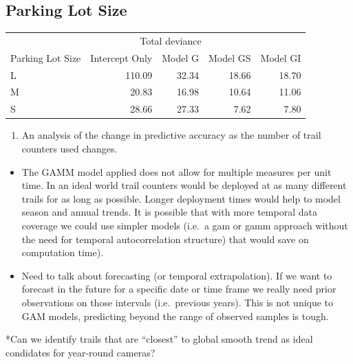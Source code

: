 \documentclass[
]{book}
\providecommand{\tightlist}{%
  \setlength{\itemsep}{0pt}\setlength{\parskip}{0pt}}
\begin{document}
\hypertarget{parking-lot-size}{%
\subsection{Parking Lot Size}\label{parking-lot-size}}

\begin{table}
\centering
\begin{tabular}{lrrrr}
\toprule
\multicolumn{1}{c}{ } & \multicolumn{3}{c}{Total deviance} \\
\cmidrule(l{3pt}r{3pt}){2-4}
Parking Lot Size & Intercept Only & Model G & Model GS & Model GI\\
\midrule
L & 110.09 & 32.34 & 18.66 & 18.70\\
M & 20.83 & 16.98 & 10.64 & 11.06\\
S & 28.66 & 27.33 & 7.62 & 7.80\\
\bottomrule
\end{tabular}
\end{table}

\begin{enumerate}
\def\labelenumi{\arabic{enumi}.}
\setcounter{enumi}{2}
\tightlist
\item
  An analysis of the change in predictive accuracy as the number of trail counters used
  changes.
\end{enumerate}

\begin{itemize}
\item
  The GAMM model applied does not allow for multiple measures per unit time. In an ideal world trail counters would be deployed at as many different trails for as long as possible. Longer deployment times would help to model season and annual trends. It is possible that with more temporal data coverage we could use simpler models (i.e.~a gam or gamm approach without the need for temporal autocorrelation structure) that would save on computation time).
\item
  Need to talk about forecasting (or temporal extrapolation). If we want to forecast in the future for a specific date or time frame we really need prior observations on those intervals (i.e.~previous years). This is not unique to GAM models, predicting beyond the range of observed samples is tough.
\end{itemize}

*Can we identify trails that are ``closest'' to global smooth trend as ideal condidates for year-round cameras?

\cleardoublepage
\end{document}
